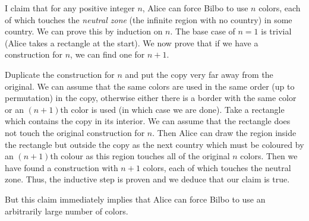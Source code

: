 I claim that for any positive integer $n$, Alice can force Bilbo to use $n$ colors, each of which touches the \emph{neutral zone} (the infinite region with no country) in some country. We can prove this by induction on $n$. The base case of $n=1$ is trivial (Alice takes a rectangle at the start). We now prove that if we have a construction for $n$, we can find one for $n+1$.

Duplicate the construction for $n$ and put the copy very far away from the original. We can assume that the same colors are used in the same order (up to permutation) in the copy, otherwise either there is a border with the same color or an $\left(n+1\right)$th color is used (in which case we are done). Take a rectangle which contains the copy in its interior. We can assume that the rectangle does not touch the original construction for $n$. Then Alice can draw the region inside the rectangle but outside the copy as the next country which must be coloured by an $\left(n+1\right)$th colour as this region touches all of the original $n$ colors. Then we have found a construction with $n+1$ colors, each of which touches the neutral zone. Thus, the inductive step is proven and we deduce that our claim is true.

But this claim immediately implies that Alice can force Bilbo to use an arbitrarily large number of colors.